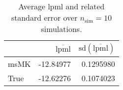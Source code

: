 \begin{table}[H]

\caption{Average lpml and related standard error over $n_{\text{sim}} = 10$ simulations.}
\centering
\begin{tabular}[t]{lrr}
\toprule
  & $\overbar{\text{lpml}}$ & $\text{sd}(\overbar{\text{lpml}})$\\
\midrule
msMK & -12.84977 & 0.1295980\\
True & -12.62276 & 0.1074023\\
\bottomrule
\end{tabular}
\end{table}